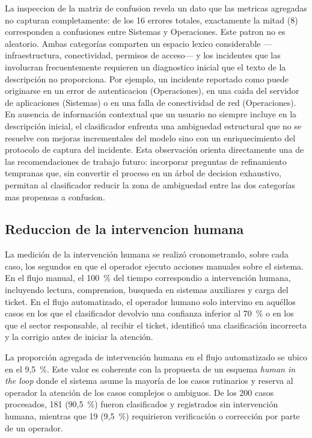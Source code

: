 La inspeccion de la matriz de confusion revela un dato que las metricas agregadas no capturan completamente: de los 16 errores totales, exactamente la mitad (8) corresponden a confusiones entre Sistemas y Operaciones. Este patron no es aleatorio. Ambas categorías comparten un espacio lexico considerable ---infraestructura, conectividad, permisos de acceso--- y los incidentes que las involucran frecuentemente requieren un diagnostico inicial que el texto de la descripción no proporciona. Por ejemplo, un incidente reportado como  puede originarse en un error de autenticacion (Operaciones), en una caida del servidor de aplicaciones (Sistemas) o en una falla de conectividad de red (Operaciones). En ausencia de información contextual que un usuario no siempre incluye en la descripción inicial, el clasificador enfrenta una ambiguedad estructural que no se resuelve con mejoras incrementales del modelo sino con un enriquecimiento del protocolo de captura del incidente. Esta observación orienta directamente una de las recomendaciones de trabajo futuro: incorporar preguntas de refinamiento tempranas que, sin convertir el proceso en un árbol de decision exhaustivo, permitan al clasificador reducir la zona de ambiguedad entre las dos categorías mas propensas a confusion.

\subsection{Reduccion de la intervencion humana}

La medición de la intervención humana se realizó cronometrando, sobre cada caso, los segundos en que el operador ejecuto acciones manuales sobre el sistema. En el flujo manual, el 100~\% del tiempo correspondio a intervención humana, incluyendo lectura, comprension, busqueda en sistemas auxiliares y carga del ticket. En el flujo automatizado, el operador humano solo intervino en aquéllos casos en los que el clasificador devolvio una confianza inferior al 70~\% o en los que el sector responsable, al recibir el ticket, identificó una clasificación incorrecta y la corrigio antes de iniciar la atención.

La proporción agregada de intervención humana en el flujo automatizado se ubico en el 9,5~\%. Este valor es coherente con la propuesta de un esquema \emph{human in the loop} donde el sistema asume la mayoría de los casos rutinarios y reserva al operador la atención de los casos complejos o ambiguos. De los 200 casos procesados, 181 (90,5~\%) fueron clasificados y registrados sin intervención humana, mientras que 19 (9,5~\%) requirieron verificación o corrección por parte de un operador.

